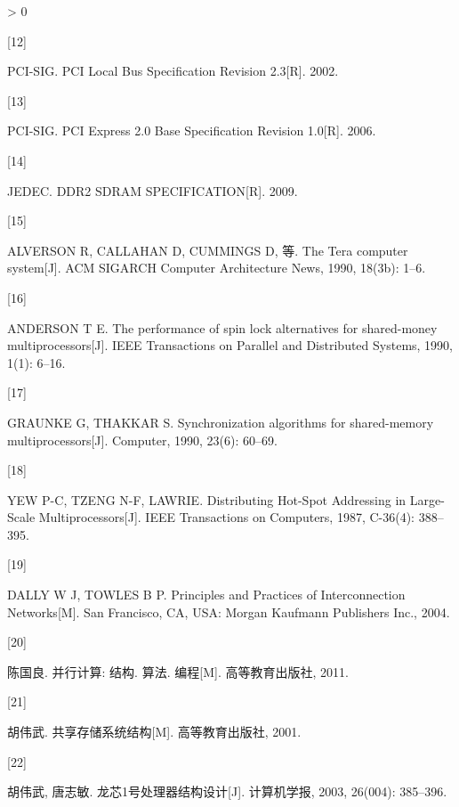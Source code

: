 \documentclass[]{ctexbook}
\newlength{\cslhangindent}
\newlength{\csllabelwidth}
\newenvironment{CSLReferences}[3] %
 {%
  \setlength{\parindent}{0pt}
  \ifodd #1 \everypar{\setlength{\hangindent}{\cslhangindent}}\ignorespaces\fi
  \ifnum #2 > 0
  \setlength{\parskip}{#3\baselineskip}
  \fi
 }%
 {}
\newcommand{\CSLLeftMargin}[1]{\parbox[t]{\maxof{\widthof{#1}}{\csllabelwidth}}{#1}}
\newcommand{\CSLRightInline}[1]{\parbox[t]{\linewidth}{#1}}
\begin{document}
\begin{CSLReferences}{0}{0}
\leavevmode\hypertarget{ref-pci-sig_pci_2002}{}%
\CSLLeftMargin{{[}12{]} }
\CSLRightInline{PCI-SIG. {PCI} {Local} {Bus} {Specification} {Revision} 2.3{[}R{]}. 2002.}

\leavevmode\hypertarget{ref-pci-sig_pci_2006}{}%
\CSLLeftMargin{{[}13{]} }
\CSLRightInline{PCI-SIG. {PCI} {Express} 2.0 {Base} {Specification} {Revision} 1.0{[}R{]}. 2006.}

\leavevmode\hypertarget{ref-jedec_ddr2_2009}{}%
\CSLLeftMargin{{[}14{]} }
\CSLRightInline{JEDEC. {DDR2} {SDRAM} {SPECIFICATION}{[}R{]}. 2009.}

\leavevmode\hypertarget{ref-alverson_tera_1990}{}%
\CSLLeftMargin{{[}15{]} }
\CSLRightInline{ALVERSON R, CALLAHAN D, CUMMINGS D, 等. The {Tera} computer system{[}J{]}. ACM SIGARCH Computer Architecture News, 1990, 18(3b): 1--6.}

\leavevmode\hypertarget{ref-anderson_performance_1990}{}%
\CSLLeftMargin{{[}16{]} }
\CSLRightInline{ANDERSON T E. The performance of spin lock alternatives for shared-money multiprocessors{[}J{]}. IEEE Transactions on Parallel and Distributed Systems, 1990, 1(1): 6--16.}

\leavevmode\hypertarget{ref-graunke_synchronization_1990}{}%
\CSLLeftMargin{{[}17{]} }
\CSLRightInline{GRAUNKE G, THAKKAR S. Synchronization algorithms for shared-memory multiprocessors{[}J{]}. Computer, 1990, 23(6): 60--69.}

\leavevmode\hypertarget{ref-yew_distributing_1987}{}%
\CSLLeftMargin{{[}18{]} }
\CSLRightInline{YEW P-C, TZENG N-F, LAWRIE. Distributing {Hot}-{Spot} {Addressing} in {Large}-{Scale} {Multiprocessors}{[}J{]}. IEEE Transactions on Computers, 1987, C-36(4): 388--395.}

\leavevmode\hypertarget{ref-dally_principles_2004}{}%
\CSLLeftMargin{{[}19{]} }
\CSLRightInline{DALLY W J, TOWLES B P. Principles and {Practices} of {Interconnection} {Networks}{[}M{]}. San Francisco, CA, USA: Morgan Kaufmann Publishers Inc., 2004.}

\leavevmode\hypertarget{ref-__2011}{}%
\CSLLeftMargin{{[}20{]} }
\CSLRightInline{陈国良. 并行计算: 结构. 算法. 编程{[}M{]}. 高等教育出版社, 2011.}

\leavevmode\hypertarget{ref-__2001}{}%
\CSLLeftMargin{{[}21{]} }
\CSLRightInline{胡伟武. 共享存储系统结构{[}M{]}. 高等教育出版社, 2001.}

\leavevmode\hypertarget{ref-_1_2003}{}%
\CSLLeftMargin{{[}22{]} }
\CSLRightInline{胡伟武, 唐志敏. 龙芯1号处理器结构设计{[}J{]}. 计算机学报, 2003, 26(004): 385--396.}


\end{CSLReferences}
\end{document}
